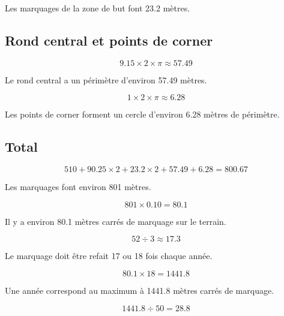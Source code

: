 \documentclass[12pt,a4paper]{article}
\begin{document}
Les marquages de la zone de but font \num{23.2} mètres.

\subsection*{Rond central et points de corner}

\begin{equation*}
	\num{9.15} \times 2 \times \pi \approx \num{57.49}
\end{equation*}

Le rond central a un périmètre d'environ \num{57.49} mètres.

\begin{equation*}
	\num{1} \times 2 \times \pi \approx \num{6.28}
\end{equation*}

Les points de corner forment un cercle d'environ \num{6.28} mètres de périmètre.

\subsection*{Total}

\begin{equation*}
	\num{510} + \num{90.25} \times 2 + \num{23.2} \times 2 + \num{57.49} + \num{6.28} = \num{800.67}
\end{equation*}

Les marquages font environ \num{801} mètres.


\begin{equation*}
801 \times \num{0.10} = \num{80.1}
\end{equation*}

Il y a environ \num{80.1} mètres carrés de marquage sur le terrain.

\begin{equation*}
52 \div 3 \approx \num{17.3}
\end{equation*}

Le marquage doit être refait 17 ou 18 fois chaque année.


\begin{equation*}
	\num{80.1} \times 18 = \num{1441.8}
\end{equation*}

Une année correspond au maximum à  \num{1441.8} mètres carrés de marquage.

\begin{equation*}
\num{1441.8} \div 50 = \num{28.8}
\end{equation*}
\end{document}
